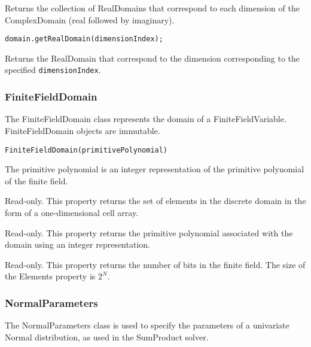 Returns the collection of RealDomains that correspond to each dimension of the ComplexDomain (real followed by imaginary).


\begin{lstlisting}
domain.getRealDomain(dimensionIndex);
\end{lstlisting}

Returns the RealDomain that correspond to the dimension corresponding to the specified \texttt{dimensionIndex}.

\fi



\subsubsection{FiniteFieldDomain}
\label{sec:FiniteFieldDomain}

The FiniteFieldDomain class represents the domain of a FiniteFieldVariable.  FiniteFieldDomain objects are immutable.


\begin{lstlisting}
FiniteFieldDomain(primitivePolynomial)
\end{lstlisting}
The primitive polynomial is an integer representation of the primitive polynomial of the finite field.



Read-only.  This property returns the set of elements in the discrete domain in the form of a one-dimensional \ifmatlab cell \fi array.


Read-only.  This property returns the primitive polynomial associated with the domain using an integer representation.


Read-only.  This property returns the number of bits in the finite field.  The size of the Elements property is $2^{N}$.




\subsubsection{NormalParameters}
\label{sec:NormalParameters}

The NormalParameters class is used to specify the parameters of a univariate Normal distribution, as used in the SumProduct solver.

